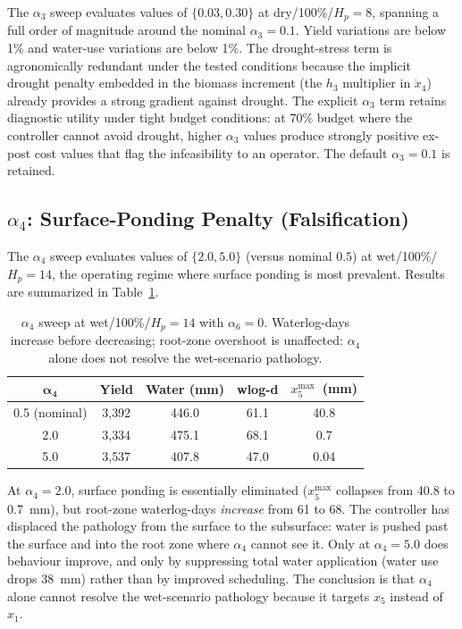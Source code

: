 The $\alpha_3$ sweep evaluates values of $\{0.03, 0.30\}$ at
dry/100\%/$H_p = 8$, spanning a full order of magnitude around the nominal
$\alpha_3 = 0.1$. Yield variations are below 1\% and water-use variations
are below 1\%. The drought-stress term is agronomically redundant under the
tested conditions because the implicit drought penalty embedded in the
biomass increment (the $h_3$ multiplier in $\dot{x}_4$) already provides a
strong gradient against drought. The explicit $\alpha_3$ term retains
diagnostic utility under tight budget conditions: at 70\% budget where the
controller cannot avoid drought, higher $\alpha_3$ values produce strongly
positive ex-post cost values that flag the infeasibility to an operator.
The default $\alpha_3 = 0.1$ is retained.

\subsection{\texorpdfstring{$\alpha_4$: Surface-Ponding Penalty (Falsification)}{Alpha4: Surface Ponding}}
\label{ssec:ctrl-sweep-a4}

The $\alpha_4$ sweep evaluates values of $\{2.0, 5.0\}$ (versus nominal
$0.5$) at wet/100\%/$H_p=14$, the operating regime where surface ponding is
most prevalent. Results are summarized in Table~\ref{tab:sweep-a4}.

\begin{table}[h]
\centering
\caption{$\alpha_4$ sweep at wet/100\%/$H_p=14$ with $\alpha_6 = 0$.
Waterlog-days increase before decreasing; root-zone overshoot is
unaffected: $\alpha_4$ alone does not resolve the wet-scenario pathology.}
\label{tab:sweep-a4}
\begin{tabular}{ccccc}
\toprule
$\boldsymbol{\alpha_4}$ & \textbf{Yield}
  & \textbf{Water (mm)} & \textbf{wlog-d} & $x_5^{\mathrm{max}}$~\textbf{(mm)} \\
\midrule
0.5 (nominal) & 3{,}392 & 446.0 & 61.1 & 40.8 \\
2.0           & 3{,}334 & 475.1 & 68.1 &  0.7 \\
5.0           & 3{,}537 & 407.8 & 47.0 & 0.04 \\
\bottomrule
\end{tabular}
\end{table}

At $\alpha_4 = 2.0$, surface ponding is essentially eliminated
($x_5^{\mathrm{max}}$ collapses from 40.8 to 0.7~mm), but root-zone
waterlog-days \emph{increase} from 61 to 68. The controller has displaced
the pathology from the surface to the subsurface: water is pushed past the
surface and into the root zone where $\alpha_4$ cannot see it. Only at
$\alpha_4 = 5.0$ does behaviour improve, and only by suppressing total water
application (water use drops 38~mm) rather than by improved scheduling.
The conclusion is that $\alpha_4$ alone cannot resolve the wet-scenario
pathology because it targets $x_5$ instead of $x_1$.

